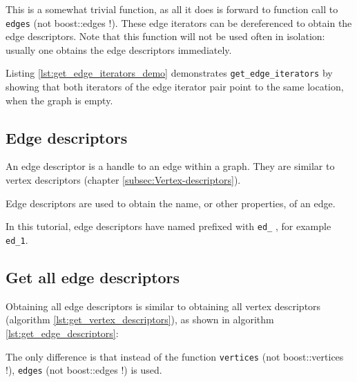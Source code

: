 This is a somewhat trivial function, as all it does is forward to function
call to \verb;edges; 
(not boost::edges !). 
These edge iterators can be dereferenced to obtain the edge descriptors.
Note that this function will not be used often in isolation: usually one
obtains the edge descriptors immediately.

Listing \ref{lst:get_edge_iterators_demo}
demonstrates \verb;get_edge_iterators; by showing that both iterators of the
edge iterator pair point to the same location, when the graph is empty.



\subsection{Edge descriptors}
\label{subsec:Edge-descriptors}

An edge descriptor is a handle to an edge within a graph.
They are similar to vertex descriptors (chapter \ref{subsec:Vertex-descriptors}).

Edge descriptors are used to obtain the name, or other properties, of an edge.

In this tutorial, edge descriptors have named prefixed with \verb;ed_;
, for example \verb;ed_1;.

\subsection{Get all edge descriptors}
\label{subsec:get_edge_descriptors}

Obtaining all edge descriptors is similar to obtaining all vertex descriptors
(algorithm \ref{lst:get_vertex_descriptors}), 
as shown in algorithm \ref{lst:get_edge_descriptors}:



The only difference is that instead of the 
function \verb;vertices; 
(not boost::vertices !), 
\verb;edges;  
(not boost::edges !) is used.

